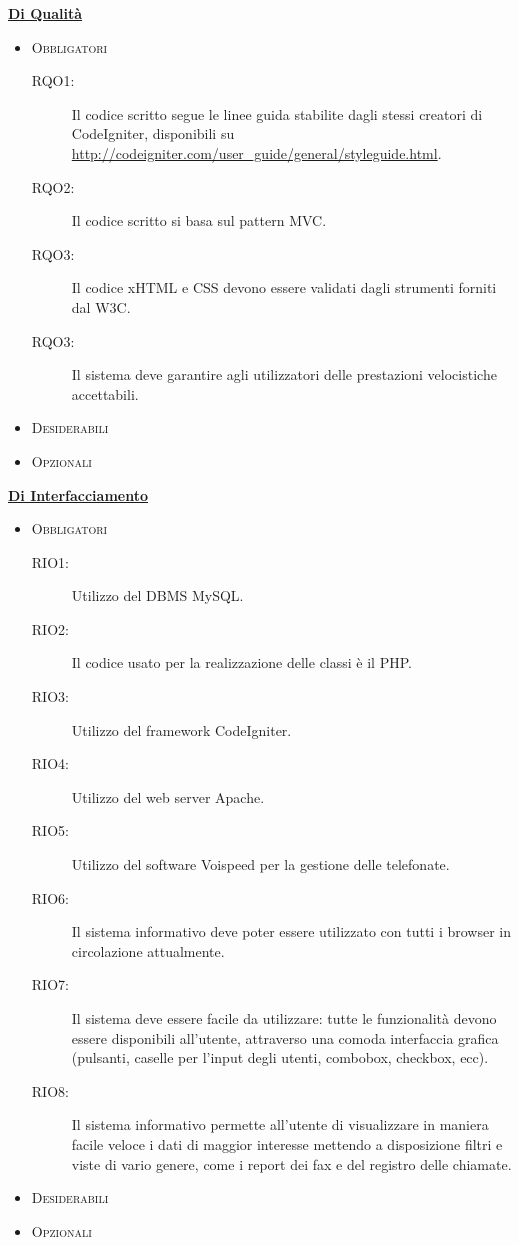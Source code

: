 \underline{\textbf{Di Qualit\`a}}
\begin{itemize}
 \item \textsc{Obbligatori}
	 \begin{description}
	  \item[RQO1:] Il codice scritto segue le linee guida stabilite dagli stessi creatori di CodeIgniter, disponibili su 
\url{http://codeigniter.com/user_guide/general/styleguide.html}.
	  \item[RQO2:] Il codice scritto si basa sul pattern MVC.
	  \item[RQO3:] Il codice xHTML e CSS devono essere validati dagli strumenti forniti dal W3C.
	  \item[RQO3:] Il sistema deve garantire agli utilizzatori delle prestazioni velocistiche accettabili.
 	\end{description}
\item \textsc{Desiderabili}
\item \textsc{Opzionali}


\end{itemize}

\underline{\textbf{Di Interfacciamento}}
\begin{itemize}
 \item \textsc{Obbligatori}
	 \begin{description}
	  \item[RIO1:] Utilizzo del DBMS MySQL.
	  \item[RIO2:] Il codice usato per la realizzazione delle classi \`e il PHP.			
	  \item[RIO3:] Utilizzo del framework CodeIgniter.
	  \item[RIO4:] Utilizzo del web server Apache.
	  \item[RIO5:] Utilizzo del software Voispeed per la gestione delle telefonate.
	  \item[RIO6:] Il sistema informativo deve poter essere utilizzato con tutti i browser in circolazione attualmente.
	  \item[RIO7:] Il sistema deve essere facile da utilizzare: tutte le funzionalit\`a devono essere disponibili 
		      all’utente, attraverso una comoda interfaccia grafica (pulsanti, caselle per l’input degli utenti,
			combobox, checkbox, ecc).
	  \item[RIO8:] Il sistema informativo permette all’utente di visualizzare in maniera facile veloce i dati di 
		      maggior interesse mettendo a disposizione filtri e viste di vario genere, come i report dei fax e del 
		      registro delle chiamate.
 	\end{description}
\item \textsc{Desiderabili}
\item \textsc{Opzionali}


\end{itemize}



